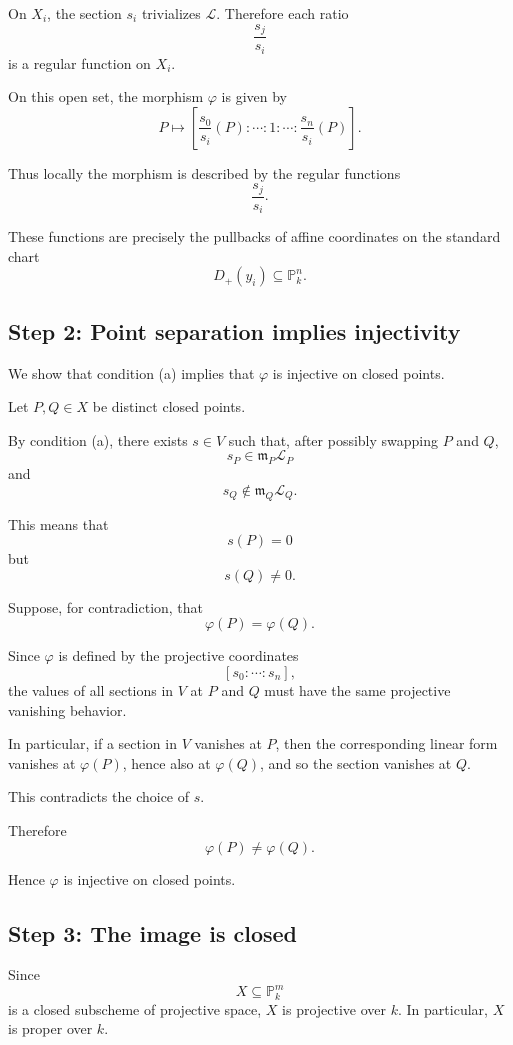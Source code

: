 On $X_i$, the section $s_i$ trivializes $\mathcal L$. Therefore each ratio
\[
\frac{s_j}{s_i}
\]
is a regular function on $X_i$.

On this open set, the morphism $\varphi$ is given by
\[
P\longmapsto
\left[
\frac{s_0}{s_i}(P):
\cdots:
1:
\cdots:
\frac{s_n}{s_i}(P)
\right].
\]

Thus locally the morphism is described by the regular functions
\[
\frac{s_j}{s_i}.
\]

These functions are precisely the pullbacks of affine coordinates on the
standard chart
\[
D_+(y_i)\subseteq \mathbb P_k^n.
\]

\subsection*{Step 2: Point separation implies injectivity}

We show that condition (a) implies that $\varphi$ is injective on closed
points.

Let $P,Q\in X$ be distinct closed points.

By condition (a), there exists $s\in V$ such that, after possibly swapping
$P$ and $Q$,
\[
s_P\in \mathfrak m_P\mathcal L_P
\]
and
\[
s_Q\notin \mathfrak m_Q\mathcal L_Q.
\]

This means that
\[
s(P)=0
\]
but
\[
s(Q)\neq0.
\]

Suppose, for contradiction, that
\[
\varphi(P)=\varphi(Q).
\]

Since $\varphi$ is defined by the projective coordinates
\[
[s_0:\cdots:s_n],
\]
the values of all sections in $V$ at $P$ and $Q$ must have the same
projective vanishing behavior.

In particular, if a section in $V$ vanishes at $P$, then the corresponding
linear form vanishes at $\varphi(P)$, hence also at $\varphi(Q)$, and so the
section vanishes at $Q$.

This contradicts the choice of $s$.

Therefore
\[
\varphi(P)\neq \varphi(Q).
\]

Hence $\varphi$ is injective on closed points.

\subsection*{Step 3: The image is closed}

Since
\[
X\subseteq \mathbb P_k^m
\]
is a closed subscheme of projective space, $X$ is projective over $k$.
In particular, $X$ is proper over $k$.

